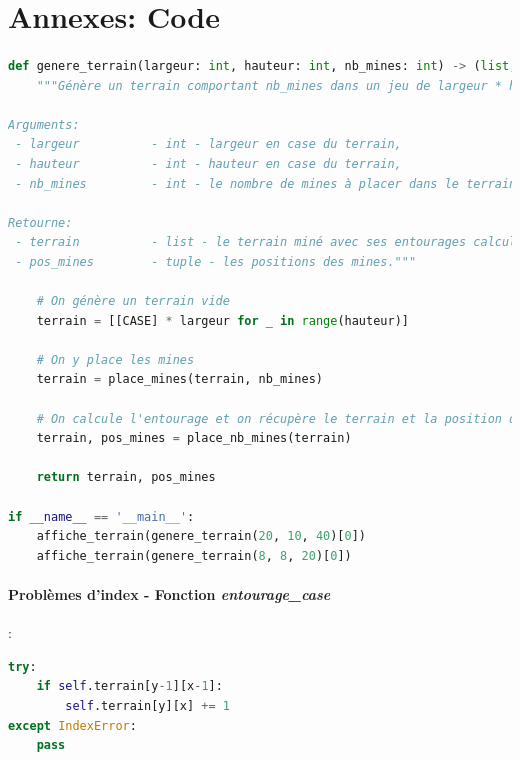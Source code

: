 \documentclass[12pt, a4paper]{article}
\begin{document}

\newpage

\section*{Annexes: Code}

\paragraph{}
\begin{lstlisting}[language=Python, caption=Exemple de documentation]
def genere_terrain(largeur: int, hauteur: int, nb_mines: int) -> (list, tuple):
    """Génère un terrain comportant nb_mines dans un jeu de largeur * hauteur.

Arguments:
 - largeur          - int - largeur en case du terrain,
 - hauteur          - int - hauteur en case du terrain,
 - nb_mines         - int - le nombre de mines à placer dans le terrain.

Retourne:
 - terrain          - list - le terrain miné avec ses entourages calculés,
 - pos_mines        - tuple - les positions des mines."""

    # On génère un terrain vide
    terrain = [[CASE] * largeur for _ in range(hauteur)]

    # On y place les mines
    terrain = place_mines(terrain, nb_mines)

    # On calcule l'entourage et on récupère le terrain et la position des mines
    terrain, pos_mines = place_nb_mines(terrain)

    return terrain, pos_mines
\end{lstlisting}

\paragraph{}
\begin{lstlisting}[language=Python, caption=Exemple des tests réalisés (ici le
fichier \emph{terrain.py})]
if __name__ == '__main__':
    affiche_terrain(genere_terrain(20, 10, 40)[0])
    affiche_terrain(genere_terrain(8, 8, 20)[0])
\end{lstlisting}

\paragraph{Problèmes d'index - Fonction \emph{entourage\_case}}:
\begin{lstlisting}[language=Python, caption=Premier problème d'index]
try:
    if self.terrain[y-1][x-1]:
        self.terrain[y][x] += 1
except IndexError:
    pass
\end{lstlisting}
\end{document}
